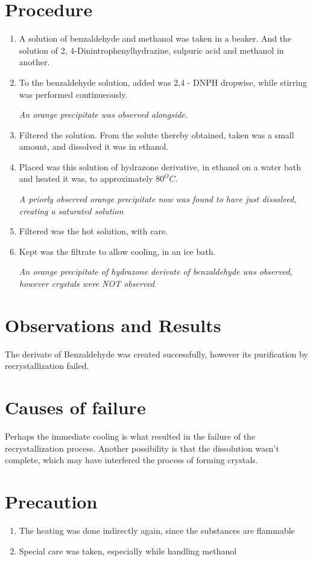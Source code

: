\section{Procedure}
	\begin{enumerate}
		\item A solution of benzaldehyde and methanol was taken in a beaker. And the solution of 2, 4-Dinintrophenylhydrazine, sulpuric acid and methanol in another.
		\item To the benzaldehyde solution, added was 2,4 - DNPH dropwise, while stirring was performed continueously.
		\par
			\emph{An orange precipitate was observed alongside.}
		\item Filtered the solution. From the solute thereby obtained, taken was a small amount, and dissolved it was in ethanol.
		\item Placed was this solution of hydrazone derivative, in ethanol on a water bath and heated it was, to approximately $80 ^O C$.
		\par
			\emph{A priorly observed orange precipitate now was found to have just dissolved, creating a saturated solution}			
		\item Filtered was the hot solution, with care.
		\item Kept was the filtrate to allow cooling, in an ice bath.
		\par
			\emph{An orange precipitate of hydrazone derivate of benzaldehyde was observed, however crystals were NOT observed}
	\end{enumerate}

\section{Observations and Results}
	The derivate of Benzaldehyde was created successfully, however its purification by recrystallization failed.

\section{Causes of failure}
	Perhaps the immediate cooling is what resulted in the failure of the recrystallization process. Another possibility is that the dissolution wasn't complete, which may have interfered the process of forming crystals.

\section{Precaution}
	\begin{enumerate}
		\item The heating was done indirectly again, since the substances are flammable
		\item Special care was taken, especially while handling methanol
	\end{enumerate}

